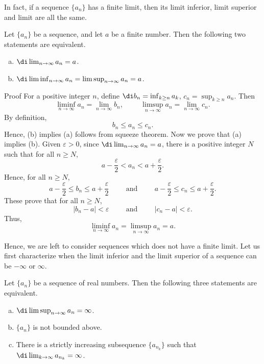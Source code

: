 In fact, if a sequence $\{a_n\}$ has a finite limit, then its limit inferior, limit superior and limit are all the same.
\begin{theorem}{}
Let $\{a_n\}$ be a sequence, and let $a$ be a finite number. Then the following two statements are equivalent.
\begin{enumerate}[(a)]
\item   $\di\lim_{n\to\infty}a_n=a$.
\item $\di \liminf_{n\to \infty}a_n=\limsup_{n\to \infty}a_n=a$.
 \end{enumerate}
\end{theorem}
\begin{myproof}
{Proof}
For a positive integer $n$, define
$\di b_n=\inf_{k\geq n}a_k$, $c_n=\sup_{k\geq n}a_n$.
Then
\[\liminf_{n\to \infty}a_n=\lim_{n\to\infty}b_n,\hspace{1cm}\limsup_{n\to \infty}a_n=\lim_{n\to\infty}c_n.\]
By definition,
\[b_n\leq a_n\leq c_n.\]
Hence, (b) implies (a) follows from squeeze theorem.
\bp
Now we prove that (a) implies (b). Given $\varepsilon>0$, since $\di\lim_{n\to\infty}a_n=a$, there is a positive integer $N$ such that for all $n\geq N$, 
\[a-\frac{\varepsilon}{2}<a_n<a+\frac{\varepsilon}{2}.\]
Hence, for all $n\geq N$,
\[ a-\frac{\varepsilon}{2}\leq b_n\leq a+\frac{\varepsilon}{2}\hspace{1cm}\text{and}\hspace{1cm}a-\frac{\varepsilon}{2}\leq c_n\leq a+\frac{\varepsilon}{2}.\]
These prove that for all $n\geq N$,
\[|b_n-a|<\varepsilon\hspace{1cm}\text{and}\hspace{1cm}|c_n-a|<\varepsilon.\]
Thus,
\[\liminf_{n\to \infty}a_n=\limsup_{n\to \infty}a_n=a.\]
\end{myproof}

Hence, we are left to consider sequences which does not have a finite limit.
 Let us first characterize when  the limit inferior and the limit superior of a sequence  can be $-\infty$ or $\infty$. 
\begin{theorem}[label=230226_1]{}
Let $\{a_n\}$ be a sequence of real numbers. Then the following three statements are equivalent.
\begin{enumerate}[(a)]
\item $\di\limsup_{n\to\infty}a_n=\infty$.
\item $\{a_n\}$ is not bounded above.
\item  There is a strictly increasing subsequence $\{a_{n_k}\}$ such that $\di\lim_{k\to\infty}a_{n_k}=\infty$.


\end{enumerate}
\end{theorem}

